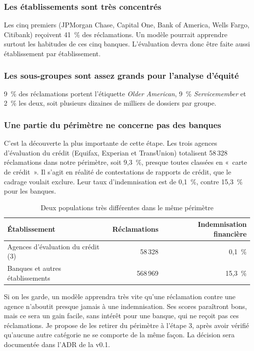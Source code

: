 \documentclass[11pt,a4paper]{article}
\begin{document}
\subsubsection*{Les établissements sont très concentrés}
Les cinq premiers (JPMorgan Chase, Capital One, Bank of America, Wells Fargo, Citibank) reçoivent 41~\% des réclamations. Un modèle pourrait apprendre surtout les habitudes de ces cinq banques. L'évaluation devra donc être faite aussi établissement par établissement.

\subsubsection*{Les sous-groupes sont assez grands pour l'analyse d'équité}
9~\% des réclamations portent l'étiquette \emph{Older American}, 9~\% \emph{Servicemember} et 2~\% les deux, soit plusieurs dizaines de milliers de dossiers par groupe.

\subsubsection*{Une partie du périmètre ne concerne pas des banques}
C'est la découverte la plus importante de cette étape. Les trois agences d'évaluation du crédit (Equifax, Experian et TransUnion) totalisent 58\,328 réclamations dans notre périmètre, soit 9,3~\%, presque toutes classées en «~carte de crédit~». Il s'agit en réalité de contestations de rapports de crédit, que le cadrage voulait exclure. Leur taux d'indemnisation est de 0,1~\%, contre 15,3~\% pour les banques.

\begin{table}[H]
\centering\small
\begin{tabular}{@{}l r r@{}}
\toprule
Établissement & Réclamations & Indemnisation financière \\
\midrule
Agences d'évaluation du crédit (3) & 58\,328 & 0,1~\% \\
Banques et autres établissements & 568\,969 & 15,3~\% \\
\bottomrule
\end{tabular}
\caption{Deux populations très différentes dans le même périmètre}
\end{table}

Si on les garde, un modèle apprendra très vite qu'une réclamation contre une agence n'aboutit presque jamais à une indemnisation. Ses scores paraîtront bons, mais ce sera un gain facile, sans intérêt pour une banque, qui ne reçoit pas ces réclamations. Je propose de les retirer du périmètre à l'étape 3, après avoir vérifié qu'aucune autre catégorie ne se comporte de la même façon. La décision sera documentée dans l'ADR de la v0.1.
\end{document}
